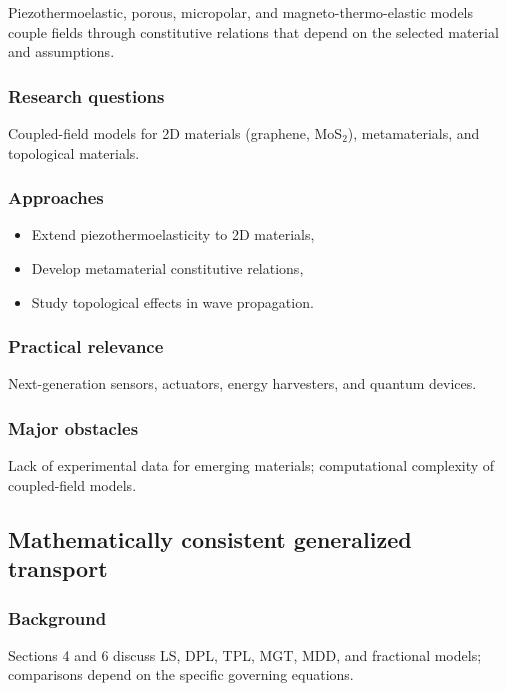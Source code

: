 Piezothermoelastic, porous, micropolar, and magneto-thermo-elastic models couple fields through constitutive relations that depend on the selected material and assumptions.

\subsubsection{Research questions}

Coupled-field models for 2D materials (graphene, MoS$_2$), metamaterials, and topological materials.

\subsubsection{Approaches}

\begin{itemize}
\item Extend piezothermoelasticity to 2D materials,
\item Develop metamaterial constitutive relations,
\item Study topological effects in wave propagation.
\end{itemize}

\subsubsection{Practical relevance}

Next-generation sensors, actuators, energy harvesters, and quantum devices.

\subsubsection{Major obstacles}

Lack of experimental data for emerging materials; computational complexity of coupled-field models.

\subsection{Mathematically consistent generalized transport}
\label{sec:consistent-transport}

\subsubsection{Background}

Sections 4 and 6 discuss LS, DPL, TPL, MGT, MDD, and fractional models; comparisons depend on the specific governing equations.

